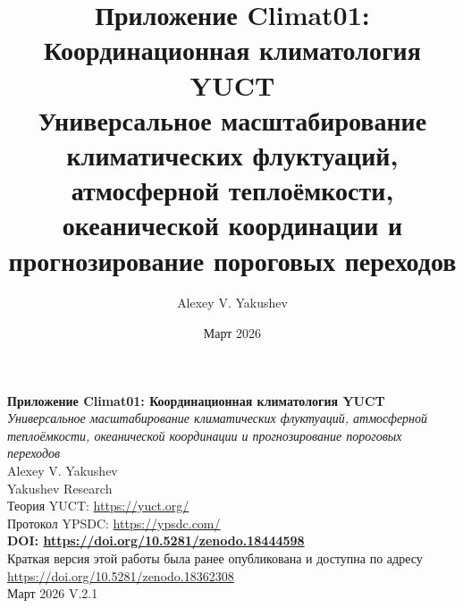 \documentclass[12pt,a4paper]{article}
\title{Приложение Climat01: Координационная климатология YUCT\\
	\large Универсальное масштабирование климатических флуктуаций, атмосферной теплоёмкости, океанической координации и прогнозирование пороговых переходов}
\author{Alexey V. Yakushev}
\date{Март 2026}
\begin{document}
	\sloppy
	
	\begin{titlepage}
		\centering
		\vspace*{1cm}
		\Huge\textbf{Приложение Climat01: Координационная климатология YUCT}\\[0.5cm]
		\large\textit{Универсальное масштабирование климатических флуктуаций, атмосферной теплоёмкости, океанической координации и прогнозирование пороговых переходов}\\[2cm]
		
		\Large Alexey V. Yakushev\\[0.3cm]
		\large Yakushev Research\\
		Теория YUCT: \url{https://yuct.org/}\\
		Протокол YPSDC: \url{https://ypsdc.com/}\\[1cm]
		
		\textbf{DOI: \url{https://doi.org/10.5281/zenodo.18444598}}\\[0.5cm]
		
		Краткая версия этой работы была ранее опубликована и доступна по адресу\\
		\url{https://doi.org/10.5281/zenodo.18362308}\\[0.5cm]
		Март 2026 \quad V.2.1\\[2cm]
		

\end{titlepage}
\end{document}
